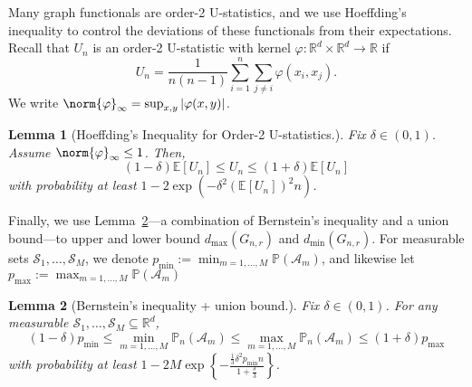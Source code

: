 \documentclass{article}
\newcommand{\Reals}{\mathbb{R}}
\newcommand{\1}{\mathbf{1}}
\newcommand{\Rd}{\Reals^d}
\newcommand{\mc}[1]{\mathcal{#1}}
\newcommand{\Pbb}{\mathbb{P}}
\newtheorem{lemma}{Lemma}[section]
\theoremstyle{definition}
\theoremstyle{remark}
\begin{document}
Many graph functionals are order-2 U-statistics, and we use Hoeffding's inequality to control the deviations of these functionals from their expectations. Recall that $U_n$ is an order-2 U-statistic with kernel $\varphi: \Rd \times \Rd \to \Reals$ if 
\begin{equation*}
U_n = \frac{1}{n(n-1)}\sum_{i = 1}^{n} \sum_{j \neq i} \varphi(x_i,x_j).
\end{equation*}
We write $\norm{\varphi}_{\infty} = \sup_{x,y} |\varphi(x,y)|$. 
\begin{lemma}[Hoeffding's Inequality for Order-2 U-statistics.]
	\label{lem:hoeffding}
	Fix $\delta \in (0,1)$. Assume $\norm{\varphi}_{\infty} \leq 1$. Then,
	\begin{equation*}
	(1 - \delta) \mathbb{E}[U_n] \leq U_n \leq (1 + \delta) \mathbb{E}[U_n]
	\end{equation*}
	with probability at least $1 - 2 \exp\left(-\delta^2 (\mathbb{E}[U_n])^2 n\right)$.
\end{lemma}

Finally, we use Lemma~\ref{lem:bernstein_union}---a combination of Bernstein's inequality and a union bound---to upper and lower bound $d_{\max}(G_{n,r})$ and $d_{\min}(G_{n,r})$. For measurable sets $\mc{S}_1,\ldots,\mc{S}_M$, we denote $p_{\min} := \min_{m = 1,\ldots,M} \Pbb(\mathcal{A}_m)$, and likewise let $p_{\max} := \max_{m = 1,\ldots,M} \Pbb(\mathcal{A}_m)$
\begin{lemma}[Bernstein's inequality + union bound.]
	\label{lem:bernstein_union}
	Fix $\delta \in (0,1)$. For any measurable $\mathcal{S}_1,\ldots,\mathcal{S}_M \subseteq \Rd$, 
	\begin{equation*}
	(1 - \delta) p_{\min} \leq \min_{m = 1,\ldots,M} \Pbb_n(\mathcal{A}_m) \leq \max_{m = 1,\ldots,M}  \Pbb_n(\mathcal{A}_m) \leq (1 + \delta) p_{\max}
	\end{equation*}
	with probability at least $1 - 2 M \exp\left\{-\frac{\frac{1}{3}\delta^2p_{\min}n}{1 + \frac{\delta}{3}}\right\}$.  
\end{lemma}
\end{document}

